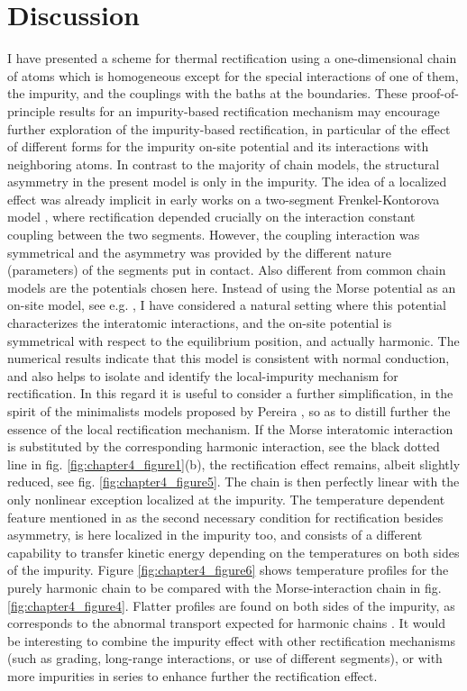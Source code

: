 \section{Discussion\label{sec:chapter4_Discussion}}

I have presented  a scheme for thermal rectification using a one-dimensional chain of atoms which is homogeneous except
for the special interactions of one of them, the impurity, and the couplings with the baths at the boundaries. These proof-of-principle results for an impurity-based rectification mechanism may encourage further exploration of the impurity-based rectification, in particular of the effect of different forms for the impurity on-site potential and its interactions with neighboring atoms.
In contrast to the majority of chain models, the structural asymmetry in the present model is only in the impurity. The idea of a localized effect was already implicit in early works on a two-segment Frenkel-Kontorova
model \cite{Li2004,Hu2006}, where rectification depended crucially on the interaction constant coupling between the two segments.
However, the coupling interaction was symmetrical and the asymmetry was provided by the different nature
(parameters) of the segments put in contact.
Also different from common chain models are the potentials chosen here. Instead of using the Morse potential as an on-site model, see e.g.  \cite{Terraneo2002},
I have considered a natural setting where this potential characterizes the interatomic interactions,
and the on-site potential is symmetrical with respect to the equilibrium position, and actually harmonic.
The numerical results indicate that this model is consistent with normal conduction,
and also helps to isolate and identify the local-impurity mechanism for rectification.
In this regard it is useful to consider a further simplification, in the spirit of the minimalists models
proposed by Pereira \cite{Pereira2017}, so as to distill further the essence of the local rectification mechanism.
If the Morse interatomic interaction is substituted by the corresponding harmonic interaction, see the black dotted line in fig. \ref{fig:chapter4_figure1}(b), the rectification effect remains, albeit slightly reduced, see fig. \ref{fig:chapter4_figure5}. The chain is then perfectly linear with the only nonlinear exception  localized
at the impurity.
The temperature dependent feature mentioned in \cite{Pereira2017} as the second necessary condition for rectification besides asymmetry, is here localized in the impurity too, and consists of a different
capability to transfer kinetic energy depending on the temperatures on both sides of the impurity.
Figure \ref{fig:chapter4_figure6} shows temperature profiles for the purely harmonic chain to be compared with the Morse-interaction
chain in fig. \ref{fig:chapter4_figure4}. Flatter profiles are found on both sides of the impurity, as corresponds to the abnormal transport expected for harmonic chains \cite{Lepri2003}. It would be interesting to combine the impurity effect with other rectification mechanisms (such as grading, long-range interactions, or use of different segments), or with more impurities in series to enhance further the rectification effect.

